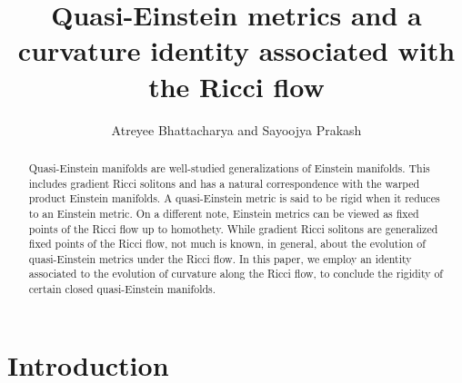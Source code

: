 \documentclass[12pt]{amsart}
\theoremstyle{definition}
\numberwithin{equation}{section}
\begin{document}
\setcounter{page}{1}

\title[Quasi-Einstein metrics and a curvature identity associated with the Ricci flow]{Quasi-Einstein metrics and a curvature identity associated with the Ricci flow}

\author[Atreyee Bhattacharya and Sayoojya Prakash]{Atreyee Bhattacharya and Sayoojya Prakash}
\begin{abstract}
Quasi-Einstein manifolds are well-studied generalizations of Einstein manifolds. This includes gradient Ricci solitons and has a natural correspondence with the warped product Einstein manifolds. A quasi-Einstein metric is said to be rigid when it reduces to an Einstein metric. On a different note, Einstein metrics can be viewed as fixed points of the Ricci flow up to homothety. While gradient Ricci solitons are generalized fixed points of the Ricci flow, not much is known, in general, about the evolution of quasi-Einstein metrics under the Ricci flow. In this paper, we employ an identity associated to the evolution of curvature along the Ricci flow, to conclude the rigidity of certain closed quasi-Einstein manifolds.   
\end{abstract}
\maketitle
\section{Introduction} 
\end{document}
